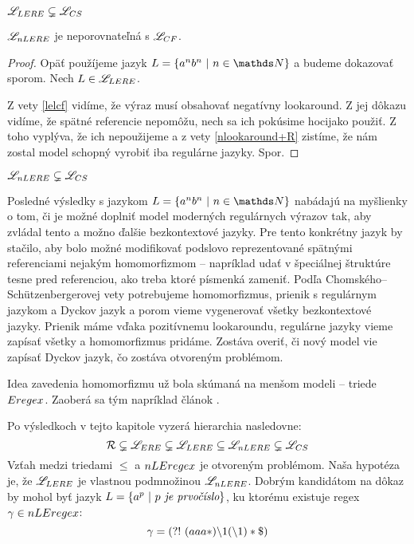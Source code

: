 \begin{dosledok}
$\mathscr{L}_{LERE} \subsetneq \mathscr{L}_{CS}$
\end{dosledok}

\begin{veta}
$\mathscr{L}_{nLERE}$ je neporovnateľná s $ \mathscr{L}_{CF}$.
\end{veta}
\begin{proof}
Opäť použíjeme jazyk $L=\lbrace a^nb^n~|~n \in \N \rbrace$ a budeme dokazovať sporom. Nech $L \in \mathscr{L}_{LERE}$.

Z vety \ref{lelcf} vidíme, že výraz musí obsahovať negatívny lookaround. Z jej dôkazu vidíme, že spätné referencie nepomôžu, nech sa ich pokúsime hocijako použiť. Z toho vyplýva, že ich nepoužijeme a z vety \ref{nlookaround+R} zistíme, že nám zostal model schopný vyrobiť iba regulárne jazyky. Spor.
\end{proof}

\begin{dosledok}
$\mathscr{L}_{nLERE} \subsetneq \mathscr{L}_{CS}$
\end{dosledok} 

Posledné výsledky s jazykom $L=\lbrace a^nb^n~|~n\in\N\rbrace$ nabádajú na myšlienky o tom, či je možné doplniť model moderných regulárnych výrazov tak, aby zvládal tento a možno ďalšie bezkontextové jazyky. Pre tento konkrétny jazyk by stačilo, aby bolo možné modifikovať podslovo reprezentované spätnými referenciami nejakým homomorfizmom -- napríklad udať v špeciálnej štruktúre tesne pred referenciou, ako treba ktoré písmenká zameniť.
Podľa Chomského--Schützenbergerovej vety potrebujeme homomorfizmus, prienik s regulárnym jazykom a Dyckov jazyk a porom vieme vygenerovať všetky bezkontextové jazyky. Prienik máme vďaka pozitívnemu lookaroundu, regulárne jazyky vieme zapísať všetky a homomorfizmus pridáme. Zostáva overiť, či nový model vie zapísať Dyckov jazyk, čo zostáva otvoreným problémom.

Idea zavedenia homomorfizmu už bola skúmaná na menšom modeli -- triede $Eregex$. Zaoberá sa tým napríklad článok \cite{plus_homomorfizmus}.
\\ \par
Po výsledkoch v tejto kapitole vyzerá hierarchia nasledovne:
$${\cal R} \subsetneq \mathscr{L}_{ERE} \subsetneq \mathscr{L}_{LERE} \subseteq \mathscr{L}_{nLERE} \subsetneq \mathscr{L}_{CS}$$
Vzťah medzi triedami $\le$ a $nLEregex$ je otvoreným problémom. Naša hypotéza je, že $\mathscr{L}_{LERE}$ je vlastnou podmnožinou $\mathscr{L}_{nLERE}$. Dobrým kandidátom na dôkaz by mohol byť jazyk $L=\lbrace a^p~|~p\emph{ je prvočíslo}\rbrace$, ku ktorému existuje regex $\gamma\in nLEregex$:
\begin{equation*}
\gamma = \text{(?!~} (aaa*)\backslash 1 (\backslash 1)*\$ )
\end{equation*}

